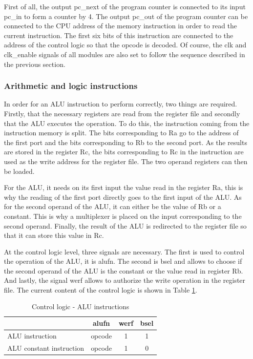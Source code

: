 First of all, the output pc\_next of the program counter is connected to its input pc\_in to form a 
counter by 4. The output pc\_out of the program counter can be connected to the CPU address of the 
memory instruction in order to read the current instruction. The first six bits of this instruction 
are connected to the address of the control logic so that the opcode is decoded. Of course, the clk 
and clk\_enable signals of all modules are also set to follow the sequence described in the previous 
section.

\subsubsection*{Arithmetic and logic instructions}

In order for an ALU instruction to perform correctly, two things are required. Firstly, that the 
necessary registers are read from the register file and secondly that the ALU executes the operation. 
To do this, the instruction coming from the instruction memory is split. The bits corresponding to 
Ra go to the address of the first port and the bits corresponding to Rb to the second port. As the 
results are stored in the register Rc, the bits corresponding to Rc in the instruction are 
used as the write address for the register file. The two operand registers can then be loaded. 

For the ALU, it needs on its first input the value read in the register Ra, this is why the reading 
of the first port directly goes to the first input of the ALU. As for the second operand of the ALU, 
it can either be the value of Rb or a constant. This is why a multiplexer is placed on the input 
corresponding to the second operand. Finally, the result of the ALU is redirected to the register 
file so that it can store this value in Rc.

At the control logic level, three signals are necessary. The first is used to control the operation 
of the ALU, it is alufn. The second is bsel and allows to choose if the second operand of the ALU 
is the constant or the value read in register Rb. And lastly, the signal werf allows to 
authorize the write operation in the register file. The current content of the control logic is 
shown in Table \ref{tab:cl/alu}.

\begin{table}[H]
    \centering
    \begin{tabular}{|l|c|c|c|}
    \hline
    \rowcolor[HTML]{DAE8FC} 
    \multicolumn{1}{|c|}{\cellcolor[HTML]{DAE8FC}\textbf{Instruction}} & \textbf{alufn} & \textbf{werf} & \textbf{bsel} \\ \hline
    ALU instruction                                                    & opcode         & 1             & 1             \\ \hline
    ALU constant instruction                                           & opcode         & 1             & 0             \\ \hline
    \end{tabular}
    \caption{Control logic - ALU instructions}
    \label{tab:cl/alu}
\end{table}

